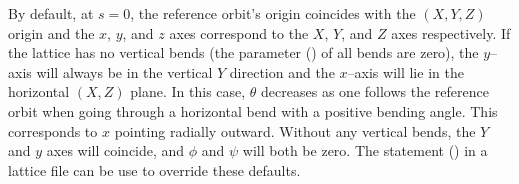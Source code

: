 By default, at $s = 0$, the reference orbit's origin coincides with the $(X, Y, Z)$ origin and the
$x$, $y$, and $z$ axes correspond to the $X$, $Y$, and $Z$ axes respectively. If the lattice has no
vertical bends (the  parameter () of all bends are zero), the $y$--axis
will always be in the vertical $Y$ direction and the $x$--axis will lie in the horizontal $(X,Z)$
plane. In this case, $\theta$ decreases as one follows the reference orbit when going through a
horizontal bend with a positive bending angle. This corresponds to $x$ pointing radially
outward. Without any vertical bends, the $Y$ and $y$ axes will coincide, and $\phi$ and $\psi$ will
both be zero. The  statement () in a lattice file can be use to
override these defaults.

